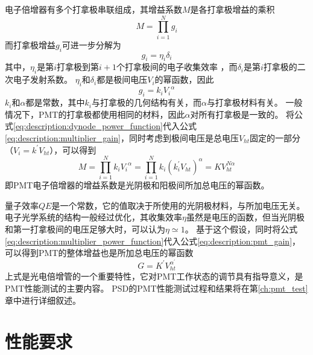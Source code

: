电子倍增器有多个打拿极串联组成，其增益系数$M$是各打拿极增益的乘积
\begin{equation}
M = \prod_{i=1}^{N} g_{i}
\label{eq:description:multiplier_gain}
\end{equation}
而打拿极增益$g_i$可进一步分解为
\begin{equation}
g_{i} = \eta_{i} \delta_{i}
\end{equation}
其中，$\eta_{i}$是第$i$打拿极到第$i+1$个打拿极间的电子收集效率 ，而$\delta_i$是第$i$打拿极的二次电子发射系数。
$\eta_{i}$和$\delta_i$都是极间电压$V_i$的幂函数，因此
\begin{equation}
g_{i} = k_i {V_i}^\alpha
\label{eq:description:dynode_power_function}
\end{equation}
$k_i$和$\alpha$都是常数，其中$k_i$与打拿极的几何结构有关，而$\alpha$与打拿极材料有关。
一般情况下，PMT的打拿极都使用相同的材料，因此$\alpha$对所有打拿极是一致的。
将公式\ref{eq:description:dynode_power_function}代入公式\ref{eq:description:multiplier_gain}，同时考虑到极间电压是总电压$V_{ht}$固定的一部分（$V_i=k^{'}V_{ht}$），可以得到
\begin{equation}
M = \prod_{i=1}^{N} k_i{V_i}^\alpha = \prod_{i=1}^{N} k_i{(k^{'}_i V_{ht})}^\alpha = KV_{ht}^{N\alpha}
\label{eq:description:multiplier_power_function}
\end{equation}
即PMT电子倍增器的增益系数是光阴极和阳极间所加总电压的幂函数。

量子效率$QE$是一个常数，它的值取决于所使用的光阴极材料，与所加电压无关。
电子光学系统的结构一般经过优化，其收集效率$\eta$虽然是电压的函数，但当光阴极和第一打拿极间的电压足够大时，可以认为$\eta\simeq1$。
基于这个假设，同时将公式\ref{eq:description:multiplier_power_function}代入公式\ref{eq:description:pmt_gain}，可以得到PMT的整体增益也是所加总电压的幂函数
\begin{equation}
G = K^{'} V_{ht}^{{\alpha}^{'}}
\label{eq:description:pmt_gain_power_function}
\end{equation}
上式是光电倍增管的一个重要特性，它对PMT工作状态的调节具有指导意义，是PMT性能测试的主要内容。
PSD的PMT性能测试过程和结果将在第\ref{ch:pmt_test}章中进行详细叙述。

\section{性能要求}
\label{sec:description:psd_requirements}

